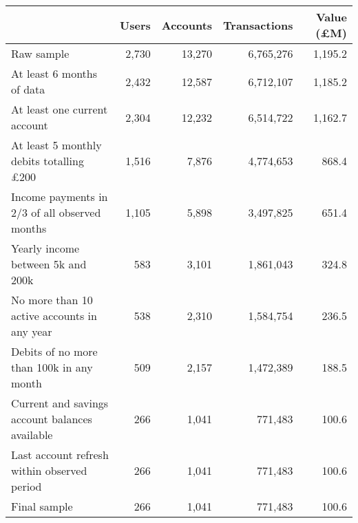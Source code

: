 \begin{tabular}{lrrrr}
\toprule
                                               & Users & Accounts & Transactions & Value (\pounds M) \\
\midrule
                                    Raw sample & 2,730 &   13,270 &    6,765,276 &           1,195.2 \\
                     At least 6 months of data & 2,432 &   12,587 &    6,712,107 &           1,185.2 \\
                  At least one current account & 2,304 &   12,232 &    6,514,722 &           1,162.7 \\
At least 5 monthly debits totalling \pounds200 & 1,516 &    7,876 &    4,774,653 &             868.4 \\
 Income payments in 2/3 of all observed months & 1,105 &    5,898 &    3,497,825 &             651.4 \\
             Yearly income between 5k and 200k &   583 &    3,101 &    1,861,043 &             324.8 \\
   No more than 10 active accounts in any year &   538 &    2,310 &    1,584,754 &             236.5 \\
      Debits of no more than 100k in any month &   509 &    2,157 &    1,472,389 &             188.5 \\
Current and savings account balances available &   266 &    1,041 &      771,483 &             100.6 \\
   Last account refresh within observed period &   266 &    1,041 &      771,483 &             100.6 \\
                                  Final sample &   266 &    1,041 &      771,483 &             100.6 \\
\bottomrule
\end{tabular}
